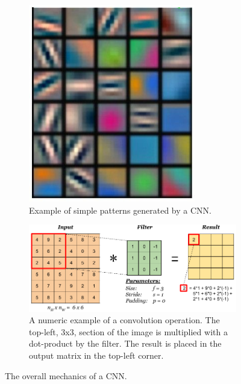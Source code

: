 \begin{figure}[!h]
	\centering
	\begin{subfigure}{0.29\textwidth}
		\includegraphics[width=\linewidth]{images/introduction/example_CNN_patterns}
		\caption{Example of simple patterns generated by a CNN.}
		\label{fig:example_CNN_patterns}
	\end{subfigure}
	\begin{subfigure}{0.7\textwidth}
		\includegraphics[width=\linewidth]{images/introduction/howItWorks_CNN}
		\captionsetup{margin=0.5cm}
		\caption{A numeric example of a convolution operation. The top-left, 3x3, section of the image is multiplied with a dot-product by the filter. The result is placed in the output matrix in the top-left corner.}
		\label{fig:howItWorks_CNN}
	\end{subfigure}
	\captionsetup{margin=0.5cm}
	\caption{The overall mechanics of a CNN.}
	\label{fig:CNN}
\end{figure}


